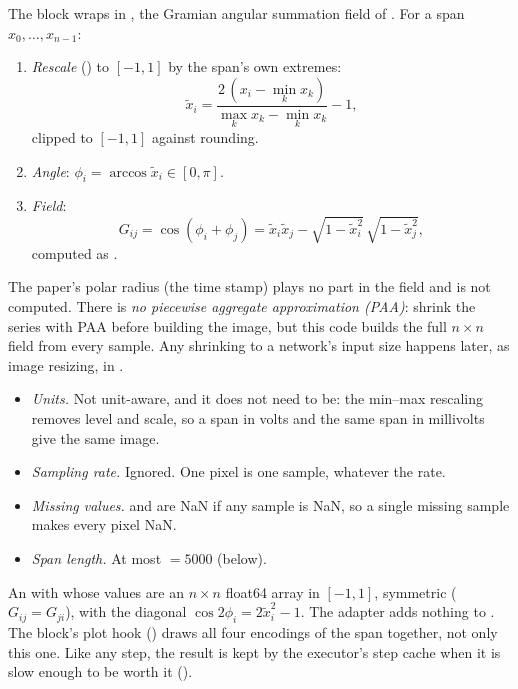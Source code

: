 The block wraps  in , the
Gramian angular summation field of \citet{wang2015imaging}. For a span $x_0,\dots,x_{n-1}$:
\begin{enumerate}
\item \emph{Rescale} () to $[-1, 1]$ by the span's own extremes:
  \[ \tilde x_i = \frac{2\,(x_i - \min_k x_k)}{\max_k x_k - \min_k x_k} - 1, \]
  clipped to $[-1,1]$ against rounding.
\item \emph{Angle}: $\phi_i = \arccos \tilde x_i \in [0, \pi]$.
\item \emph{Field}:
  \[ G_{ij} = \cos(\phi_i + \phi_j) = \tilde x_i \tilde x_j - \sqrt{1-\tilde x_i^2}\,\sqrt{1-\tilde x_j^2}, \]
  computed as .
\end{enumerate}
The paper's polar radius (the time stamp) plays no part in the field and is not computed.
There is \emph{no piecewise aggregate approximation (PAA)}: \citet{wang2015imaging} shrink the
series with PAA before building the image, but this code builds the full $n \times n$ field
from every sample. Any shrinking to a network's input size happens later, as image resizing,
in .

\begin{itemize}
\item \emph{Units.} Not unit-aware, and it does not need to be: the min--max rescaling
  removes level and scale, so a span in volts and the same span in millivolts give the same
  image.
\item \emph{Sampling rate.} Ignored. One pixel is one sample, whatever the rate.
\item \emph{Missing values.}  and  are NaN if any sample is NaN,
  so a single missing sample makes every pixel NaN.
\item \emph{Span length.} At most  $= 5000$ (below).
\end{itemize}

An  with  whose values are an $n \times n$ float64 array in
$[-1, 1]$, symmetric ($G_{ij} = G_{ji}$), with the diagonal $\cos 2\phi_i = 2\tilde x_i^2 - 1$.
The adapter adds nothing to . The block's plot hook ()
draws all four encodings of the span together, not only this one. Like any step, the result
is kept by the executor's step cache when it is slow enough to be worth it
().

